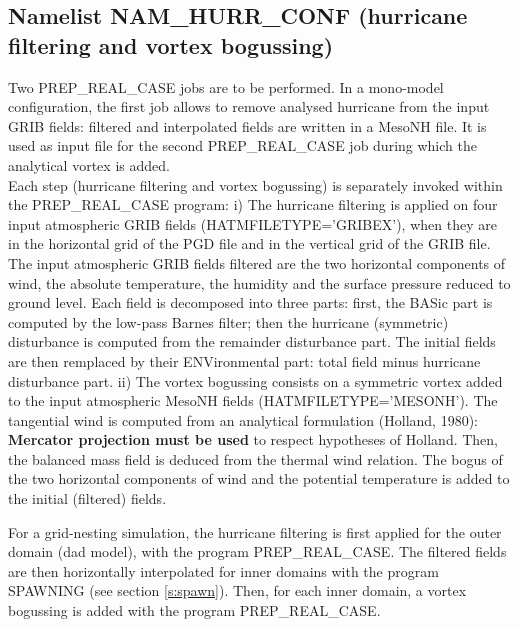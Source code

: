 \subsection{Namelist NAM\_HURR\_CONF (hurricane filtering and vortex bogussing)}
Two PREP\_REAL\_CASE jobs are to be performed.
In a mono-model configuration, the
first job allows to remove analysed hurricane from the input GRIB fields:
filtered and interpolated fields are written in a MesoNH file.
It is used as input file for the second
PREP\_REAL\_CASE job during which the analytical vortex is added.\\

Each step (hurricane filtering and vortex bogussing) is separately invoked
within the PREP\_REAL\_CASE program:
\subitem
i) The hurricane filtering is applied on four input atmospheric GRIB fields
(HATMFILETYPE='GRIBEX'), when they are in the horizontal grid of the PGD file
and in the vertical grid of the GRIB file. The input atmospheric GRIB fields 
filtered are the two horizontal components of wind, the absolute temperature,
the humidity 
and the surface pressure reduced to ground level. Each field is decomposed 
into three parts: first, the BASic part is computed by the low-pass Barnes
filter; then the hurricane (symmetric) disturbance is computed from the 
remainder disturbance part. The initial fields are then remplaced by their 
ENVironmental part: total field minus hurricane disturbance part.
\subitem
ii) The vortex bogussing consists on a symmetric vortex added to the input
atmospheric MesoNH fields (HATMFILETYPE='MESONH'). 
The tangential wind is computed from an analytical formulation (Holland, 1980):
{\bf Mercator projection must be used} to respect hypotheses of Holland.
Then, the balanced mass field is deduced
from the thermal wind relation. The bogus of the two horizontal components of
wind and the potential temperature is added to the initial (filtered) fields.

For a grid-nesting simulation, the hurricane filtering is first applied for
the outer domain (dad model), with the program PREP\_REAL\_CASE.
The filtered fields are then horizontally interpolated for inner domains
with the program SPAWNING (see section \ref{s:spawn}). 
Then, for each inner domain, a vortex bogussing is added with the program
PREP\_REAL\_CASE.

